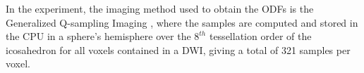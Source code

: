 \documentclass[twoside,twocolumn,10pt]{article}
\begin{document}





In the experiment, the imaging method used to obtain the ODFs is the Generalized Q-sampling Imaging \cite{yeh2010}, where the samples are computed and stored in the CPU in a sphere's hemisphere over the $8^{th}$ tessellation order of the icosahedron for all voxels contained in a DWI, giving a total of 321 samples per voxel.







\end{document}
